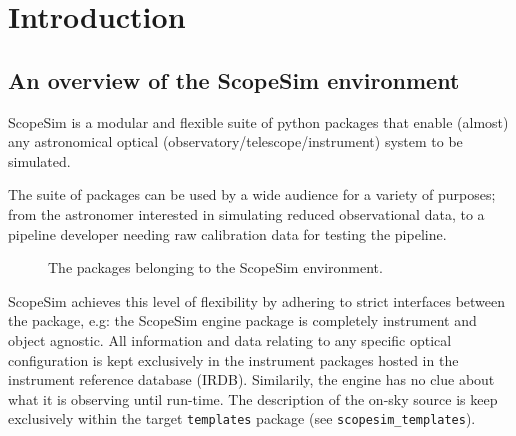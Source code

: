 

\section{Introduction%
  \label{introduction}%
}


\subsection{An overview of the ScopeSim environment%
  \label{an-overview-of-the-scopesim-environment}%
}

ScopeSim is a modular and flexible suite of python packages that enable (almost) any astronomical optical (observatory/telescope/instrument) system to be simulated.

The suite of packages can be used by a wide audience for a variety of purposes; from the astronomer interested in simulating reduced observational data, to a pipeline developer needing raw calibration data for testing the pipeline.

\begin{figure}
\noindent{}\label{fig-scopesim-environment}
\caption{The packages belonging to the ScopeSim environment.}
\end{figure}

ScopeSim achieves this level of flexibility by adhering to strict interfaces between the package, e.g: the ScopeSim engine package is completely instrument and object agnostic.
All information and data relating to any specific optical configuration is kept exclusively in the instrument packages hosted in the instrument reference database (IRDB).
Similarily, the engine has no clue about what it is observing until run-time.
The description of the on-sky source is keep exclusively within the target \texttt{templates} package (see \texttt{scopesim\_templates}).

